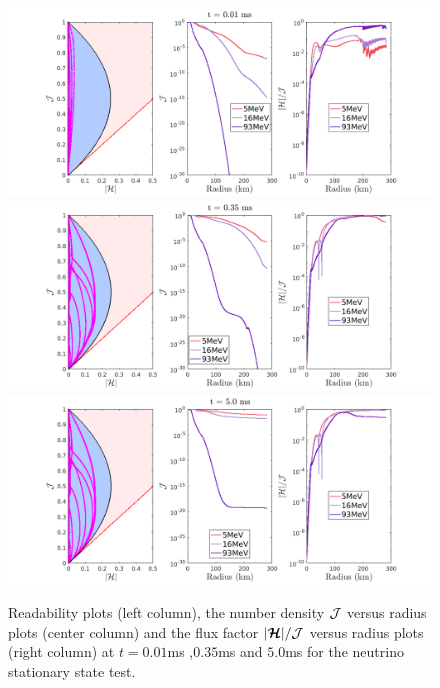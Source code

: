 \begin{figure}[h]
  \centering
    \includegraphics[width=\textwidth]{figures/NSS_1_1}\\
    \includegraphics[width=\textwidth]{figures/NSS_3_1} \\
    \includegraphics[width=\textwidth]{figures/NSS_5_1} \\
   \caption{Readability plots (left column), the number density $\mathcal{J}$ versus radius plots (center column) and the flux factor $|\boldsymbol{\mathcal{H}}|/\mathcal{J}$ versus radius plots (right column) at $t = 0.01$ms ,$0.35$ms and $5.0$ms for the neutrino stationary state test.}
      \label{fig:NeutrinoStationaryTestEvolve}
\end{figure}